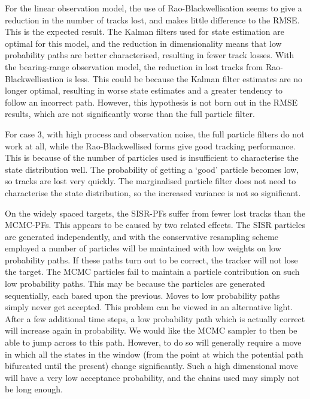 For the linear observation model, the use of Rao-Blackwellisation seems to give a reduction in the number of tracks lost, and makes little difference to the RMSE. This is the expected result. The Kalman filters used for state estimation are optimal for this model, and the reduction in dimensionality means that low probability paths are better characterised, resulting in fewer track losses. With the bearing-range observation model, the reduction in lost tracks from Rao-Blackwellisation is less. This could be because the Kalman filter estimates are no longer optimal, resulting in worse state estimates and a greater tendency to follow an incorrect path. However, this hypothesis is not born out in the RMSE results, which are not significantly worse than the full particle filter.

For case 3, with high process and observation noise, the full particle filters do not work at all, while the Rao-Blackwellised forms give good tracking performance. This is because of the number of particles used is insufficient to characterise the state distribution well. The probability of getting a `good' particle becomes low, so tracks are lost very quickly. The marginalised particle filter does not need to characterise the state distribution, so the increased variance is not so significant.

On the widely spaced targets, the SISR-PFs suffer from fewer lost tracks than the MCMC-PFs. This appears to be caused by two related effects. The SISR particles are generated independently, and with the conservative resampling scheme employed a number of particles will be maintained with low weights on low probability paths. If these paths turn out to be correct, the tracker will not lose the target. The MCMC particles fail to maintain a particle contribution on such low probability paths. This may be because the particles are generated sequentially, each based upon the previous. Moves to low probability paths simply never get accepted. This problem can be viewed in an alternative light. After a few additional time steps, a low probability path which is actually correct will increase again in probability. We would like the MCMC sampler to then be able to jump across to this path. However, to do so will generally require a move in which all the states in the window (from the point at which the potential path bifurcated until the present) change significantly. Such a high dimensional move will have a very low acceptance probability, and the chains used may simply not be long enough.

